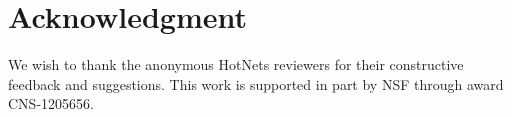 \section{Acknowledgment}
\label{sec:ack}
We wish to thank the anonymous HotNets reviewers for their constructive
feedback and suggestions. This work is supported in part by NSF through award CNS-1205656.
